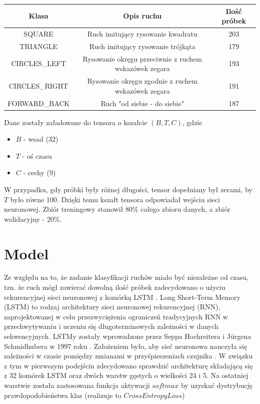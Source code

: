 \documentclass[10pt]{article}
\begin{document}
\pagebreak

\begin{center}

\begin{tabular}{ |c|c|c| } 
  \hline
  Klasa & Opis ruchu & Ilość próbek \\ 
  \hline
  SQUARE & Ruch imitujący rysowanie kwadratu & 203 \\ 
  \hline
  TRIANGLE & Ruch imitujący rysowanie trójkąta & 179 \\ 
  \hline
  CIRCLES\_LEFT & Rysowanie okręgu przeciwnie z ruchem wskazówek zegara & 193 \\
  \hline
  CIRCLES\_RIGHT & Rysowanie okręgu zgodnie z ruchem wskazówek zegara & 191 \\
  \hline
  FORWARD\_BACK & Ruch "od siebie - do siebie" & 187 \\
  \hline
\end{tabular}
\end{center}

Dane zostały załadowane do tensora o kszałcie $(B, T, C)$, gdzie
\begin{itemize}
\item $B$ - wsad (32)
\item $T$ - oś czasu
\item $C$ - cechy (9)
\end{itemize}  

W przypadku, gdy próbki były różnej długości, tensor dopełniany był zerami, by $T$ było równe 100. Dzięki temu kszałt tensora odpowiadał wejściu sieci neuronowej. Zbiór treningowy stanowił 80\% całego zbioru danych, a zbiór walidacyjny - 20\%.

\section{Model}

Ze względu na to, że zadanie klasyfikacji ruchów miało być niezależne od czasu, tzn. że ruch mógł zawierać dowolną ilość próbek zadecydowano o użyciu rekurencyjnej sieci neuronowej z komórką LSTM \cite{staudemeyer2019understanding}.
Long Short-Term Memory (LSTM) to rodzaj architektury sieci neuronowej rekurencyjnej (RNN), zaprojektowanej w celu przezwyciężenia ograniczeń tradycyjnych RNN w przechwytywaniu i uczeniu się długoterminowych zależności w danych sekwencyjnych. LSTMy zostały wprowadzone przez Seppa Hochreitera i Jürgena Schmidhubera w 1997 roku \cite{hochreiter1997long}. Założeniem było, aby sieć neuronowa nauczyła się zależności w czasie pomiędzy zmianami w przyśpieszeniach czujnika \cite{rivera2017recognition} \cite{ashry2018lstm}. W związku z tym w pierwszym podejściu zdecydowano sprawdzić architekturę składającą się z 32 komórek LSTM oraz dwóch warstw gęstych o wielkości 24 i 5. Na ostatniej warstwie została zastosowana funkcja aktywacji $softmax$ by uzyskać dystrybucję prawdopodobieństwa klas (realizuje to $CrossEntropyLoss$)
\end{document}
